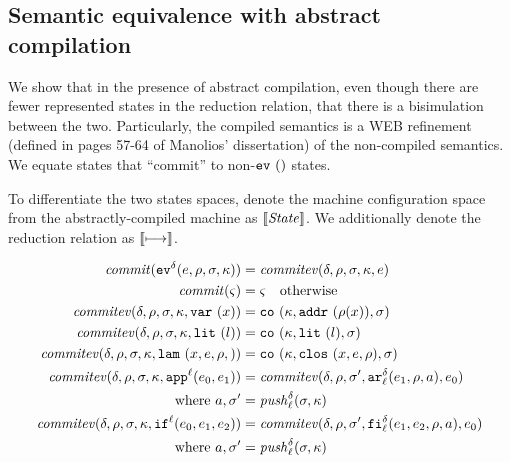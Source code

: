 \documentclass{llncs}
\begin{document}
\subsection{Semantic equivalence with abstract compilation}

We show that in the presence of abstract compilation, even though
there are fewer represented states in the reduction relation, that
there is a bisimulation between the two. Particularly, the compiled
semantics is a WEB refinement (defined in pages 57-64 of Manolios'
dissertation) of the non-compiled semantics. We equate states that
``commit'' to non-$\ev{}$ states.

To differentiate the two states spaces, denote the machine
configuration space from the abstractly-compiled machine as
$\CompState$. We additionally denote the reduction relation as $\cmachstep$.

\begin{align*}
\commit(\ev[^\mcntr]{\mexp,\menv,\msto,\mkont}) &= \commitev(\mcntr,\menv,\msto,\mkont,\mexp) \\
\commit(\mstate) &= \mstate \quad \text{otherwise} \\
\commitev(\mcntr,\menv,\msto,\mkont,\svar{\mvar}) &= \co{\mkont,\saddr{\menv(\mvar)},\msto} \\
\commitev(\mcntr,\menv,\msto,\mkont,\slit\mlit) &= \co{\mkont,\slit\mlit,\msto} \\
\commitev(\mcntr,\menv,\msto,\mkont,\slam{\mvar,\mexp,\menv}) &= \co{\mkont,\clos{\mvar,\mexp,\menv},\msto} \\
\commitev(\mcntr,\menv,\msto,\mkont,\sapp[^\mlab]{\mexpi0}{\mexpi1}) &=
  \commitev(\mcntr,\menv,\msto',\kar[^\mcntr_\mlab]{\mexpi1, \menv, \maddr},\mexpi0) \\
 \text{ where } \maddr, \msto' &= \push_\mlab^\mcntr(\msto,\mkont) \\
\commitev(\mcntr,\menv,\msto,\mkont,\sif[^\mlab]{\mexpi0}{\mexpi1}{\mexpi2}) &=
  \commitev(\mcntr,\menv,\msto',\kif[^\mcntr_\mlab]{\mexpi1, \mexpi2, \menv, \maddr},\mexpi0) \\
 \text{ where } \maddr, \msto' &= \push_\mlab^\mcntr(\msto,\mkont)
\end{align*}
\end{document}
